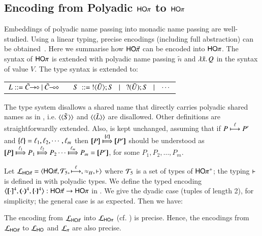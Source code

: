 \subsection{Encoding from Polyadic $\mathsf{HO}\pi$ to $\mathsf{HO}\pi$}
\label{subsec:pho}
\noi Embeddings of polyadic name passing into monadic name passing are
well-studied. %
Using a linear typing, precise
encodings (including full abstraction) can be obtained~\cite{Yoshida96}.
Here we summarise how $\mathsf{HO}{\vec{\pi}}$ can be encoded into $\mathsf{HO}\pi$. 
The syntax of 
$\mathsf{HO}\pi$ is extended %
with
polyadic name passing $\tilde{n}$ and $\lambda \tilde{x}.\,Q$ in the syntax 
of value $V$. The type syntax is extended to: 
%
\begin{center}
\begin{tabular}{c}
$
L ::= \shot{\tilde{C}} \ | \ \lhot{\tilde{C}}
\quad\quad S \ ::= \  \btout{\tilde{U}} S \bnfbar \btinp{\tilde{U}} S \bnfbar \cdots 
$
\end{tabular}
\end{center}
%
The type system disallows a shared name that directly carries polyadic
shared names as in \cite{tlca07,MostrousY15},
i.e. $\langle \tilde{\langle S \rangle} \rangle$ 
and $\langle \tilde{\langle L \rangle} \rangle$ 
are disallowed.
Other definitions are straightforwardly extended. 
Also,  is kept unchanged, 
assuming that if 
$P \stackrel{\ell}{\longmapsto} P'$ and $\{\!\!\{\ell\}\!\!\} = \ell_1, \ell_2,  \cdots, \ell_m$ then
$\map{P} \Hby{\mapa{\ell}} \map{P'}$
should be understood as
$\map{P} \Hby{\ell_1} P_1 \Hby{\ell_2} P_2 \cdots \Hby{\ell_m} P_m =  \map{P'}$,
for some
$P_1, P_2, \ldots, P_m$.

Let $\tyl{L}_{\PHOp}=\calc{\PHOp}{{\cal{T}}_5}{\hby{\ell}}{\wb_H}{\proves}$
where 
${\cal{T}}_5$ is a set of types of $\mathsf{HO\pi^{+}}$;  
the typing $\vdash$ is defined in 
 with polyadic types. 
We define %
the typed encoding $\enco{\map{\cdot}^{4}, \mapt{\cdot}^{4}, \mapa{\cdot}^{4}}: \PHOp \to \HOp$ 
in . We give the dyadic case (tuples of length 2), for simplicity;
the general case is as expected.
Then we have:

\smallskip 

\begin{theorem}
\label{f:enc:phopiptohopi}
The encoding from $\mathcal{L}_{\mathsf{HO}{\vec{\pi}}}$ into $\mathcal{L}_{\mathsf{HO}\pi}$ (cf. )
is precise. 
Hence, the encodings 
from $\mathcal{L}_{\mathsf{HO}{\vec{\pi}}}$ to 
$\mathcal{L}_{\mathsf{HO}}$ 
and $\mathcal{L}_{\pi}$ 
are also precise. 
\end{theorem}

